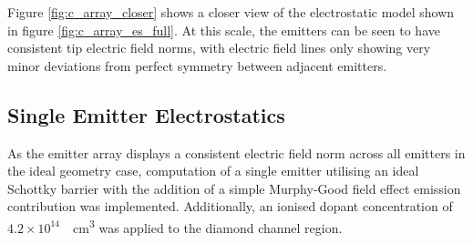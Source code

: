 \begin{refsection}
Figure \ref{fig:c_array_closer} shows a closer view of the electrostatic model shown in figure \ref{fig:c_array_es_full}. At this scale, the emitters can be seen to have consistent tip electric field norms, with electric field lines only showing very minor deviations from perfect symmetry between adjacent emitters.


\subsection{Single Emitter Electrostatics}
As the emitter array displays a consistent electric field norm across all emitters in the ideal geometry case, computation of a single emitter utilising an ideal Schottky barrier with the addition of a simple Murphy-Good field effect emission contribution was implemented. Additionally, an ionised dopant concentration of $4.2\times10^{14}$~\si{\per\centi\metre\cubed} was applied to the diamond channel region.


\end{refsection}
